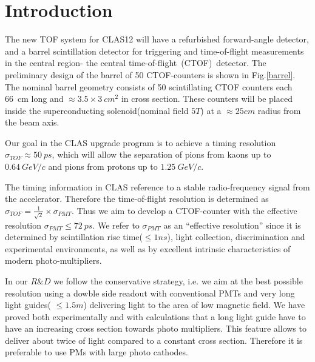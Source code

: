 




\section{Introduction}

The new TOF system for CLAS12\cite{upgrade} will have a refurbished forward-angle detector, and 
a barrel scintillation detector for triggering and time-of-flight
measurements in the central region- the central time-of-flight~(CTOF)~detector.
The preliminary design of the barrel of 50 CTOF-counters is shown in Fig.\ref{barrel}.
The nominal barrel geometry consists of 50 scintillating
 CTOF counters each 66~cm long 
and $\approx3.5\times3~cm^2$ in cross section.
These counters will be placed inside the superconducting 
solenoid(nominal field $5T$) at a $\approx25cm$ radius from the beam axis.


Our goal in  the CLAS upgrade program 
is to achieve a timing resolution 
$\sigma_{TOF}\approx 50~ps$, 
which will allow the separation of pions from kaons 
up to $0.64~GeV/c$ and pions from protons up to $1.25~GeV/c$.


The timing information in CLAS\cite{r2} reference to 
  a stable  radio-frequency signal from the accelerator.  
Therefore  the time-of-flight resolution  is determined as  $ \sigma_{TOF}=\frac{1}{\sqrt{2}}\times\sigma_{PMT}$. 
 Thus we aim  to develop a  CTOF-counter  with  the effective  
resolution $\sigma_{PMT}\leq 72~ps$.
We  refer to  $\sigma_{PMT}$   as  an ``effective resolution'' 
since it is determined  by scintillation rise time($\leq1ns$), light collection, 
discrimination and  experimental environments, as 
well as by excellent intrinsic characteristics 
of modern photo-multipliers.

In our $R\&D$ we follow the conservative strategy, i.e.
 we aim at the best possible resolution
using a dowble side readout with  conventional PMTs and very long light guides( $\leq1.5m$) 
delivering light to the area of low magnetic field.
We have proved both experimentally and with calculations that a  long 
light guide have to have an increasing cross section  towards  photo multipliers.
This feature allows to deliver about twice of  light compared to a constant cross section. 
Therefore  it is  preferable to use PMs with large photo cathodes.

